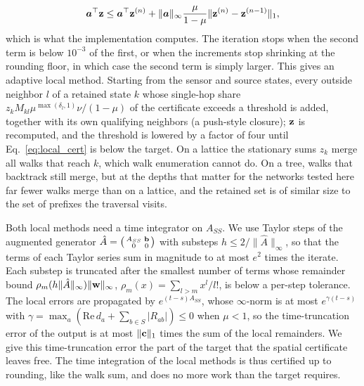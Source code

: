 \begin{equation}\label{eq:local_cert_n}
\bm{a}^\top{\bf z}\le\bm{a}^\top{\bf z}^{(n)}+\|\bm{a}\|_\infty\frac{\mu}{1-\mu}\|{\bf z}^{(n)}-{\bf z}^{(n-1)}\|_1 ,
\end{equation}
which is what the implementation computes. The iteration stops when the second term is below $10^{-3}$ of the first, or when the increments stop shrinking at the rounding floor, in which case the second term is simply larger. This gives an adaptive local method. Starting from the sensor and source states, every outside neighbor $l$ of a retained state $k$ whose single-hop share $z_kM_{kl}\mu^{\max(\delta_l,1)}\nu/(1-\mu)$ of the certificate exceeds a threshold is added, together with its own qualifying neighbors (a push-style closure); ${\bf z}$ is recomputed, and the threshold is lowered by a factor of four until Eq.~\eqref{eq:local_cert} is below the target. On a lattice the stationary sums $z_k$ merge all walks that reach $k$, which walk enumeration cannot do. On a tree, walks that backtrack still merge, but at the depths that matter for the networks tested here far fewer walks merge than on a lattice, and the retained set is of similar size to the set of prefixes the traversal visits.

Both local methods need a time integrator on $A_{SS}$. We use Taylor steps of the augmented generator $\hat A=\left(\begin{smallmatrix}A_{SS}&{\bf b}\\0&0\end{smallmatrix}\right)$ with substeps $h\le2/\|\hat A\|_\infty$, so that the terms of each Taylor series sum in magnitude to at most $e^2$ times the iterate. Each substep is truncated after the smallest number of terms whose remainder bound $\rho_m(h\|\hat A\|_\infty)\|{\bf w}\|_\infty$, $\rho_m(x)=\sum_{l>m}x^l/l!$, is below a per-step tolerance. The local errors are propagated by $e^{(t-s)A_{SS}}$, whose $\infty$-norm is at most $e^{\gamma(t-s)}$ with $\gamma=\max_a(\mathrm{Re}\,d_a+\sum_{b\in S}|R_{ab}|)\le0$ when $\mu<1$, so the time-truncation error of the output is at most $\|{\bf c}\|_1$ times the sum of the local remainders. We give this time-truncation error the part of the target that the spatial certificate leaves free. The time integration of the local methods is thus certified up to rounding, like the walk sum, and does no more work than the target requires.

